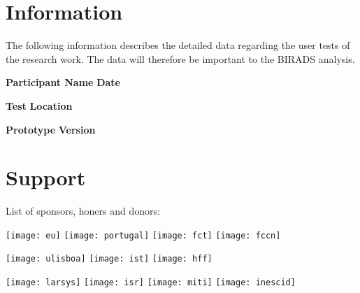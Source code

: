 
\section*{Information}

The following information describes the detailed data regarding the user tests of the research work. The data will therefore be important to the BIRADS analysis.

\vspace{1cm}

\textbf{Participant Name} \hfill \textbf{Date}

\vspace{2.5cm}

\textbf{Test} \hfill \textbf{Location}

\vspace{2.5cm}

\textbf{Prototype} \hfill \textbf{Version}

\vfill


\section*{Support}

\hfill

List of sponsors, honers and donors:

\hfill


\hfill

\texttt{[image: eu]} \hfill \texttt{[image: portugal]} \hfill \texttt{[image: fct]} \hfill \texttt{[image: fccn]}

\hfill

\texttt{[image: ulisboa]} \hfill \texttt{[image: ist]} \hfill \texttt{[image: hff]}

\hfill

\texttt{[image: larsys]} \hfill \texttt{[image: isr]} \hfill \texttt{[image: miti]} \hfill \texttt{[image: inescid]}

\hfill

